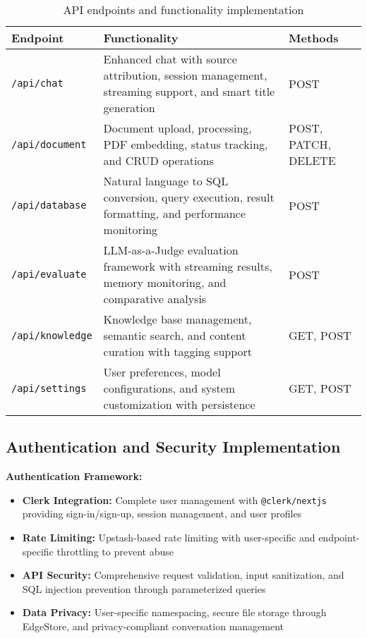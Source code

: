 \begin{table}[H]
\centering
\caption{API endpoints and functionality implementation}
\label{tab:api_endpoints_s2}
\begin{tabular}{|p{3cm}|p{9cm}|p{3cm}|}
\hline
\textbf{Endpoint} & \textbf{Functionality} & \textbf{Methods} \\
\hline
\texttt{/api/chat} & Enhanced chat with source attribution, session management, streaming support, and smart title generation & POST \\
\hline
\texttt{/api/document} & Document upload, processing, PDF embedding, status tracking, and CRUD operations & POST, PATCH, DELETE \\
\hline
\texttt{/api/database} & Natural language to SQL conversion, query execution, result formatting, and performance monitoring & POST \\
\hline
\texttt{/api/evaluate} & LLM-as-a-Judge evaluation framework with streaming results, memory monitoring, and comparative analysis & POST \\
\hline
\texttt{/api/knowledge} & Knowledge base management, semantic search, and content curation with tagging support & GET, POST \\
\hline
\texttt{/api/settings} & User preferences, model configurations, and system customization with persistence & GET, POST \\
\hline
\end{tabular}
\end{table}

\subsection{Authentication and Security Implementation}
\label{subsec:security_implementation_s2}

\textbf{Authentication Framework:}
\begin{itemize}
    \item \textbf{Clerk Integration:} Complete user management with \texttt{@clerk/nextjs} providing sign-in/sign-up, session management, and user profiles
    \item \textbf{Rate Limiting:} Upstash-based rate limiting with user-specific and endpoint-specific throttling to prevent abuse
    \item \textbf{API Security:} Comprehensive request validation, input sanitization, and SQL injection prevention through parameterized queries
    \item \textbf{Data Privacy:} User-specific namespacing, secure file storage through EdgeStore, and privacy-compliant conversation management
\end{itemize}


